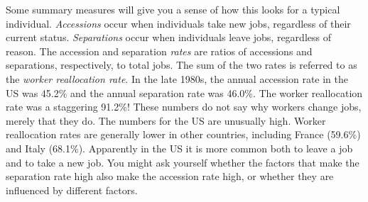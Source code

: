 \documentclass[letterpaper,12pt]{article}
\begin{document}
Some summary measures will give you a sense of how this looks for
a typical individual.  {\it Accessions\/} occur when individuals
take new jobs, regardless of their current status. {\it
Separations\/} occur when individuals leave jobs, regardless of
reason. The accession and separation {\it rates\/} are ratios of
accessions and separations, respectively, to total jobs.  The sum
of the two rates is referred to as the \textit{worker reallocation
rate}. In the late 1980s, the annual accession rate in the US was
45.2\% and the annual separation rate was 46.0\%.  The worker
reallocation rate was a staggering 91.2\%! These numbers do not
say why workers change jobs, merely that they do. The numbers for
the US are unusually high.  Worker reallocation rates are
generally lower in other countries, including France (59.6\%) and
Italy (68.1\%). Apparently in the US it is more common both to
leave a job and to take a new job.
You might ask yourself whether the factors that make the separation rate 
high also make the accession rate high, or whether they are 
influenced by different factors.  

\begin{comment}
Fine points (feel free to skip). Part of worker reallocation is induced by job
reallocation. That is, when a job is created, there is always an
accession and when a job is destroyed there is always a
separation. The opposite, however is not true. Accessions can
occur without a new job being created and separations can occur
without a job being destroyed. This happens whenever a company
substitutes a worker for another one in exactly the same position.
The excess of worker reallocation over job reallocation is called \textit{excess worker reallocation}.
\end{comment}
\end{document}
